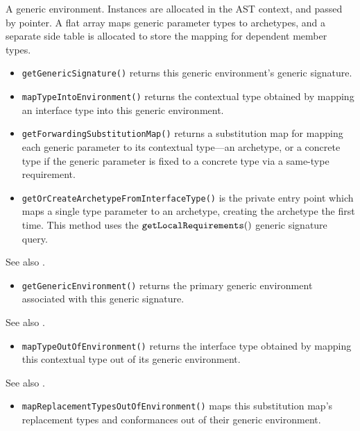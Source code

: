 \documentclass[../generics]{subfiles}
\begin{document}
A generic environment. Instances are allocated in the AST context, and passed by pointer. A flat array maps generic parameter types to archetypes, and a separate side table is allocated to store the mapping for dependent member types.
\begin{itemize}
\item \texttt{getGenericSignature()} returns this generic environment's generic signature.
\item \texttt{mapTypeIntoEnvironment()} returns the contextual type obtained by mapping an interface type into this generic environment.
\item \texttt{getForwardingSubstitutionMap()} returns a substitution map for mapping each generic parameter to its contextual type---an archetype, or a concrete type if the generic parameter is fixed to a concrete type via a same-type requirement.

\item \texttt{getOrCreateArchetypeFromInterfaceType()} is the private entry point which maps a single type parameter to an archetype, creating the archetype the first time. This method uses the $\texttt{getLocalRequirements}()$ generic signature query.
\end{itemize}

See also .
\begin{itemize}
\item \texttt{getGenericEnvironment()} returns the primary generic environment associated with this generic signature.
\end{itemize}

See also .
\begin{itemize}
\item \texttt{mapTypeOutOfEnvironment()} returns the interface type obtained by mapping this contextual type out of its generic environment.
\end{itemize}

See also .
\begin{itemize}
\item \texttt{mapReplacementTypesOutOfEnvironment()} maps this substitution map's replacement types and conformances out of their generic environment.
\end{itemize}
\end{document}
